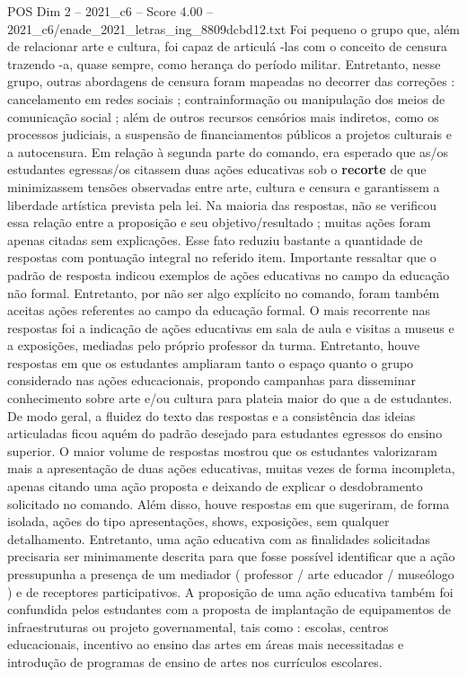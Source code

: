 \begin{textsample}{POS Dim 2 – 2021\_c6 – Score 4.00 – 2021\_c6/enade\_2021\_letras\_ing\_8809dcbd12.txt}
Foi pequeno o grupo que, além de relacionar arte e cultura, foi capaz de articulá -las com o conceito de censura trazendo -a, quase sempre, como herança do período militar.
Entretanto, nesse grupo, outras abordagens de censura foram mapeadas no decorrer das correções : cancelamento em redes sociais ; contrainformação ou manipulação dos meios de comunicação social ; além de outros recursos censórios mais indiretos, como os processos judiciais, a suspensão de financiamentos públicos a projetos culturais e a autocensura.
Em relação à segunda parte do comando, era esperado que as/os estudantes egressas/os citassem duas ações educativas sob o \textbf{recorte} de que minimizassem tensões observadas entre arte, cultura e censura e garantissem a liberdade artística prevista pela lei.
Na maioria das respostas, não se verificou essa relação entre a proposição e seu objetivo/resultado ; muitas ações foram apenas citadas sem explicações.
Esse fato reduziu bastante a quantidade de respostas com pontuação integral no referido item.
Importante ressaltar que o padrão de resposta indicou exemplos de ações educativas no campo da educação não formal.
Entretanto, por não ser algo explícito no comando, foram também aceitas ações referentes ao campo da educação formal.
O mais recorrente nas respostas foi a indicação de ações educativas em sala de aula e visitas a museus e a exposições, mediadas pelo próprio professor da turma.
Entretanto, houve respostas em que os estudantes ampliaram tanto o espaço quanto o grupo considerado nas ações educacionais, propondo campanhas para disseminar conhecimento sobre arte e/ou cultura para plateia maior do que a de estudantes.
De modo geral, a fluidez do texto das respostas e a consistência das ideias articuladas ficou aquém do padrão desejado para estudantes egressos do ensino superior.
O maior volume de respostas mostrou que os estudantes valorizaram mais a apresentação de duas ações educativas, muitas vezes de forma incompleta, apenas citando uma ação proposta e deixando de explicar o desdobramento solicitado no comando.
Além disso, houve respostas em que sugeriram, de forma isolada, ações do tipo apresentações, shows, exposições, sem qualquer detalhamento.
Entretanto, uma ação educativa com as finalidades solicitadas precisaria ser minimamente descrita para que fosse possível identificar que a ação pressupunha a presença de um mediador ( professor / arte educador / museólogo ) e de receptores participativos.
A proposição de uma ação educativa também foi confundida pelos estudantes com a proposta de implantação de equipamentos de infraestruturas ou projeto governamental, tais como : escolas, centros educacionais, incentivo ao ensino das artes em áreas mais necessitadas e introdução de programas de ensino de artes nos currículos escolares.

\end{textsample}

